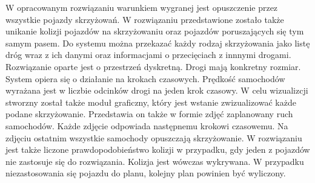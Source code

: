 W opracowanym rozwiązaniu warunkiem wygranej jest opuszczenie przez wszystkie pojazdy skrzyżowań.
\newline
\newline
W rozwiązaniu przedstawione zostało także unikanie kolizji pojazdów na skrzyżowaniu oraz pojazdów poruszających się tym samym pasem.
\newline
\newline
Do systemu można przekazać każdy rodzaj skrzyżowania jako listę dróg wraz z ich danymi oraz informacjami o przecięciach z innnymi drogami.
\newline
\newline
Rozwiązanie oparte jest o przestrzeń dyskretną. Drogi mają konkretny rozmiar. System opiera się o działanie na krokach czasowych. Prędkość samochodów wyrażana jest w liczbie odcinków drogi na jeden krok czasowy.
\newline
\newline
W celu wizualizcji stworzny został także moduł graficzny, który jest wstanie zwizualizować każde podane skrzyżowanie. Przedstawia on także w formie zdjęć zaplanowany ruch samochodów. Każde zdjęcie odpowiada następnemu krokowi czasowemu. Na zdjęciu ostatnim wszystkie samochody opuszczają skrzyżowanie.
\newline
\newline
W rozwiązaniu jest także liczone prawdopodobieństwo kolizji w przypadku, gdy jeden z pojazdów nie zastosuje się do rozwiązania. Kolizja jest wówczas wykrywana. W przypadku niezastosowania się pojazdu do planu, kolejny plan powinien być wyliczony.
